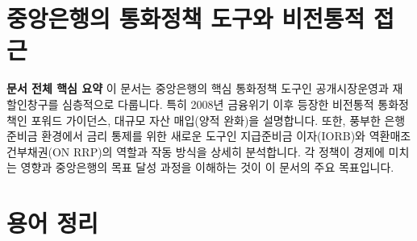 \documentclass[11pt,a4paper]{article}
\theoremstyle{definition}
\begin{document}
\newpage
\section{중앙은행의 통화정책 도구와 비전통적 접근}

\begin{summarybox}
  \textbf{문서 전체 핵심 요약}
  이 문서는 중앙은행의 핵심 통화정책 도구인 공개시장운영과 재할인창구를 심층적으로 다룹니다.
  특히 2008년 금융위기 이후 등장한 비전통적 통화정책인 포워드 가이던스, 대규모 자산 매입(양적 완화)을 설명합니다.
  또한, 풍부한 은행 준비금 환경에서 금리 통제를 위한 새로운 도구인 지급준비금 이자(IORB)와 역환매조건부채권(ON RRP)의 역할과 작동 방식을 상세히 분석합니다.
  각 정책이 경제에 미치는 영향과 중앙은행의 목표 달성 과정을 이해하는 것이 이 문서의 주요 목표입니다.
\end{summarybox}

\newpage
\section{용어 정리}
\end{document}
